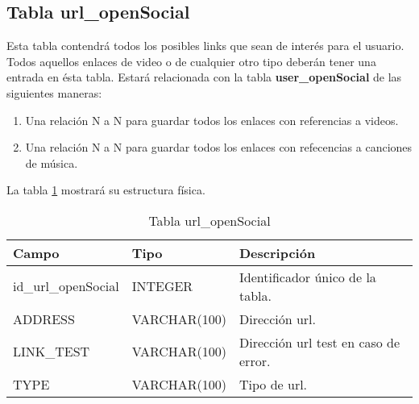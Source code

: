 \subsection{Tabla url\_openSocial}
Esta tabla contendrá todos los posibles links que sean de interés para el usuario. Todos aquellos enlaces de video o de cualquier otro tipo deberán tener una entrada en ésta tabla. Estará relacionada con la tabla \textbf{user\_openSocial} de las siguientes maneras:
\begin{enumerate}
\item Una relación N a N para guardar todos los enlaces con referencias a videos.
\item Una relación N a N para guardar todos los enlaces con refecencias a canciones de música.
\end{enumerate}
\bigskip
\par
La tabla \ref{tabUrlOpenSocial} mostrará su estructura física.
\begin{table}[h]
\begin{center}
\begin{tabular}{| l | l | p{60mm} |}\hline
\textbf{Campo}&\textbf{Tipo}&\textbf{Descripción} \\ \hline
id\_url\_openSocial & INTEGER & Identificador único de la tabla. \\ \hline
ADDRESS & VARCHAR(100) & Dirección url. \\ \hline
LINK\_TEST & VARCHAR(100) & Dirección url test en caso de error. \\ \hline
TYPE & VARCHAR(100) & Tipo de url. \\ \hline
\end{tabular}
\end{center}
\caption{Tabla url\_openSocial} \label{tabUrlOpenSocial}
\end{table}

